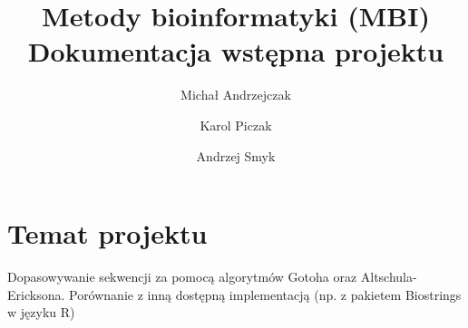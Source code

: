 \documentclass[a4paper,10pt]{article}
\title{Metody bioinformatyki (MBI)\\Dokumentacja wstępna projektu}
\author{Michał Andrzejczak
		\and
		Karol Piczak
		\and
		Andrzej Smyk
		}
\begin{document}
	\maketitle
	\section{Temat projektu}

	Dopasowywanie sekwencji za pomocą algorytmów Gotoha oraz Altschula-Ericksona. Porównanie z inną dostępną implementacją (np. z pakietem Biostrings w języku R)
\end{document}
